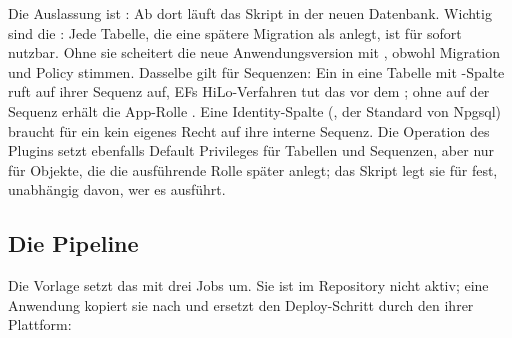 Die Auslassung ist : Ab dort läuft das Skript in der neuen
Datenbank. Wichtig sind die : Jede Tabelle, die eine spätere Migration als
 anlegt, ist für  sofort nutzbar.
Ohne sie scheitert die neue Anwendungsversion mit , obwohl Migration und
Policy stimmen. Dasselbe gilt für Sequenzen: Ein  in eine Tabelle mit
-Spalte ruft  auf ihrer Sequenz auf, EFs HiLo-Verfahren tut das vor
dem ; ohne  auf der Sequenz erhält die App-Rolle . Eine Identity-Spalte (, der Standard von
Npgsql) braucht für ein  kein eigenes Recht auf ihre interne Sequenz. Die
Operation  des Plugins setzt ebenfalls
Default Privileges für Tabellen und Sequenzen, aber nur für Objekte, die die ausführende Rolle
später anlegt; das Skript legt sie für  fest, unabhängig davon,
wer es ausführt.

\subsection*{Die Pipeline}

\begin{flowdiagram}
\end{flowdiagram}

Die Vorlage 
setzt das mit drei Jobs um. Sie ist im Repository nicht aktiv; eine Anwendung kopiert sie
nach  und ersetzt den Deploy-Schritt durch den ihrer
Plattform:

